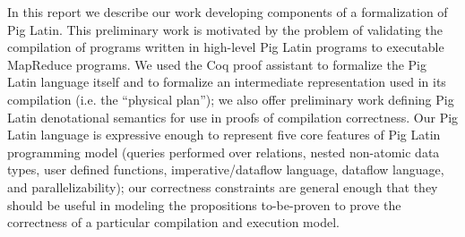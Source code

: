 In this report we describe our work developing components of a formalization of Pig Latin. This preliminary work is motivated by the problem of validating the compilation of programs written in high-level Pig Latin programs to executable MapReduce programs. We used the Coq proof assistant to formalize the Pig Latin language itself and to formalize an intermediate representation used in its compilation (i.e. the ``physical plan''); we also offer preliminary work defining Pig Latin denotational semantics for use in proofs of compilation correctness. Our Pig Latin language is expressive enough to represent five core features of Pig Latin programming model (queries performed over relations, nested non-atomic data types, user defined functions, imperative/dataflow language, dataflow language, and parallelizability); our correctness constraints are general enough that they should be useful in modeling the propositions to-be-proven to prove the correctness of a particular compilation and execution model.
